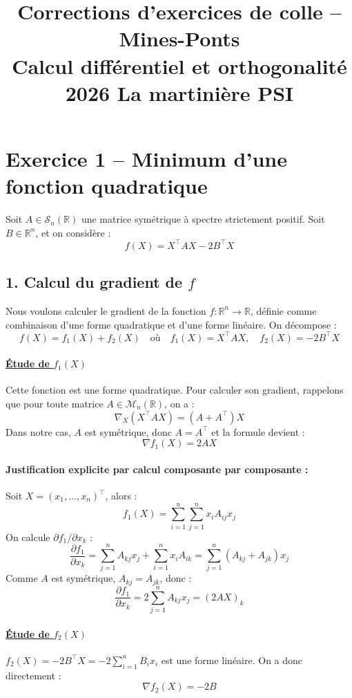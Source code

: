 \documentclass[a4paper,12pt]{article}
\title{Corrections d'exercices de colle -- Mines-Ponts \\ Calcul diff\'erentiel et orthogonalit\'e 2026 La martinière PSI}
\author{}
\date{}
\begin{document}
\maketitle

\section*{Exercice 1 -- Minimum d'une fonction quadratique}

Soit \( A \in \mathcal{S}_n(\mathbb{R}) \) une matrice sym\'etrique \`a spectre strictement positif. Soit \( B \in \mathbb{R}^n \), et on consid\`ere :
\[
f(X) = X^\top A X - 2 B^\top X
\]

\subsection*{1. Calcul du gradient de \( f \)}
Nous voulons calculer le gradient de la fonction \( f : \mathbb{R}^n \to \mathbb{R} \), d\'efinie comme combinaison d'une forme quadratique et d'une forme lin\'eaire. On d\'ecompose :
\[
f(X) = f_1(X) + f_2(X) \quad \text{o\`u} \quad f_1(X) = X^\top A X, \quad f_2(X) = -2 B^\top X
\]

\paragraph{\underline{Étude de \( f_1(X) \)}} Cette fonction est une forme quadratique. Pour calculer son gradient, rappelons que pour toute matrice \( A \in \mathcal{M}_n(\mathbb{R}) \), on a :
\[
\nabla_X (X^\top A X) = (A + A^\top) X
\]
Dans notre cas, \( A \) est sym\'etrique, donc \( A = A^\top \) et la formule devient :
\[
\boxed{\nabla f_1(X) = 2 A X}
\]

\paragraph{Justification explicite par calcul composante par composante :} Soit \( X = (x_1, \dots, x_n)^\top \), alors :
\[
f_1(X) = \sum_{i=1}^n \sum_{j=1}^n x_i A_{ij} x_j
\]
On calcule \( \partial f_1 / \partial x_k \) :
\[
\frac{\partial f_1}{\partial x_k} = \sum_{j=1}^n A_{kj} x_j + \sum_{i=1}^n x_i A_{ik} = \sum_{j=1}^n (A_{kj} + A_{jk}) x_j
\]
Comme \( A \) est sym\'etrique, \( A_{kj} = A_{jk} \), donc :
\[
\frac{\partial f_1}{\partial x_k} = 2 \sum_{j=1}^n A_{kj} x_j = (2AX)_k
\]

\paragraph{\underline{Étude de \( f_2(X) \)}} \( f_2(X) = -2 B^\top X = -2 \sum_{i=1}^n B_i x_i \) est une forme lin\'eaire. On a donc directement :
\[
\boxed{\nabla f_2(X) = -2 B}
\]
\end{document}
